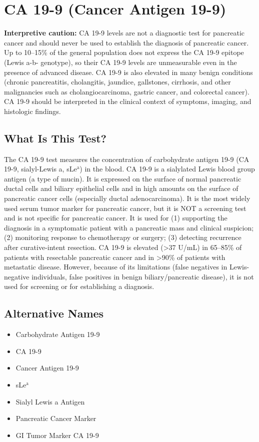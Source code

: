 \chapter{CA 19-9 (Cancer Antigen 19-9)}

\textbf{Interpretive caution:} CA 19-9 levels are not a diagnostic test for pancreatic cancer and should never be used to establish the diagnosis of pancreatic cancer. Up to 10--15\% of the general population does not express the CA 19-9 epitope (Lewis a-b- genotype), so their CA 19-9 levels are unmeasurable even in the presence of advanced disease. CA 19-9 is also elevated in many benign conditions (chronic pancreatitis, cholangitis, jaundice, gallstones, cirrhosis, and other malignancies such as cholangiocarcinoma, gastric cancer, and colorectal cancer). CA 19-9 should be interpreted in the clinical context of symptoms, imaging, and histologic findings.

\section*{What Is This Test?}
The CA 19-9 test measures the concentration of carbohydrate antigen 19-9 (CA 19-9, sialyl-Lewis a, sLe$^\text{a}$) in the blood. CA 19-9 is a sialylated Lewis blood group antigen (a type of mucin). It is expressed on the surface of normal pancreatic ductal cells and biliary epithelial cells and in high amounts on the surface of pancreatic cancer cells (especially ductal adenocarcinoma). It is the most widely used serum tumor marker for pancreatic cancer, but it is NOT a screening test and is not specific for pancreatic cancer. It is used for (1) supporting the diagnosis in a symptomatic patient with a pancreatic mass and clinical suspicion; (2) monitoring response to chemotherapy or surgery; (3) detecting recurrence after curative-intent resection. CA 19-9 is elevated (>37 U/mL) in 65--85\% of patients with resectable pancreatic cancer and in >90\% of patients with metastatic disease. However, because of its limitations (false negatives in Lewis-negative individuals, false positives in benign biliary/pancreatic disease), it is not used for screening or for establishing a diagnosis.

\section*{Alternative Names}
\begin{itemize}
  \item Carbohydrate Antigen 19-9
  \item CA 19-9
  \item Cancer Antigen 19-9
  \item sLe$^\text{a}$
  \item Sialyl Lewis a Antigen
  \item Pancreatic Cancer Marker
  \item GI Tumor Marker CA 19-9
\end{itemize}
